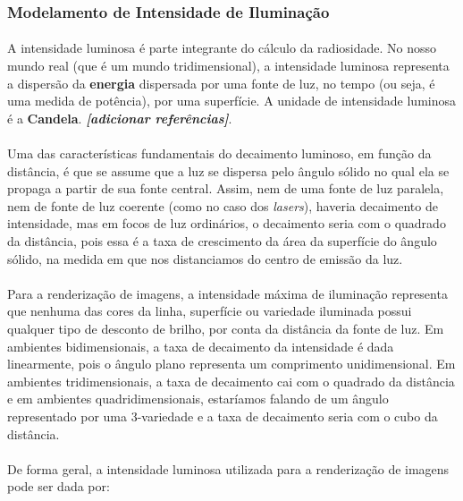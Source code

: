\documentclass{article}
\begin{document}
	\subsubsection{Modelamento de Intensidade de Iluminação} \label{intensidade-1}
	
	\paragraph{}
	A intensidade luminosa é parte integrante do cálculo da radiosidade. No nosso mundo real (que é um mundo tridimensional), a intensidade luminosa representa a dispersão da \textbf{energia} dispersada por uma fonte de luz, no tempo (ou seja, é uma medida de potência), por uma superfície. A unidade de intensidade luminosa é a \textbf{Candela}. \textit{\textbf{[adicionar referências]}}. 
	
	\paragraph{}
	Uma das características fundamentais do decaimento luminoso, em função da distância, é que se assume que a luz se dispersa pelo ângulo sólido no qual ela se propaga a partir de sua fonte central. Assim, nem de uma fonte de luz paralela, nem de fonte de luz coerente (como no caso dos \textit{lasers}), haveria decaimento de intensidade, mas em focos de luz ordinários, o decaimento seria com o quadrado da distância, pois essa é a taxa de crescimento da área da superfície do ângulo sólido, na medida em que nos distanciamos do centro de emissão da luz.
	
	\paragraph{}
	Para a renderização de imagens, a intensidade máxima de iluminação representa que nenhuma das cores da linha, superfície ou variedade iluminada possui qualquer tipo de desconto de brilho, por conta da distância da fonte de luz. Em ambientes bidimensionais, a taxa de decaimento da intensidade é dada linearmente, pois o ângulo plano representa um comprimento unidimensional. Em ambientes tridimensionais, a taxa de decaimento cai com o quadrado da distância e em ambientes quadridimensionais, estaríamos falando de um ângulo representado por uma 3-variedade e a taxa de decaimento seria com o cubo da distância.
	
	\paragraph{}
	De forma geral, a intensidade luminosa utilizada para a renderização de imagens pode ser dada por:
	
\end{document}
